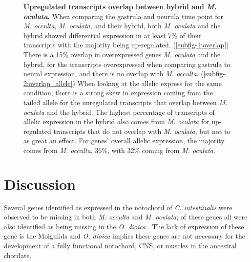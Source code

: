 \begin{figure}[!ht]
	\caption{\textbf{Upregulated transcripts overlap between hybrid and \textit{M. oculata}.} When comparing the gastrula and neurula time point for \textit{M. occulta}, \textit{M. oculata}, and their hybrid, both \textit{M. oculata} and the hybrid showed differential expression in at least 7\% of their transcripts with the majority being up-regulated. (\ref{subfig-1:overlap}) There is a 15\% overlap in overexpressed genes \textit{M. oculata} and the hybrid, for the transcripts overexpressed when comparing gastrula to neural expression, and there is no overlap with \textit{M. occulta}. (\ref{subfig-2:overlap_allele}) When looking at the allelic express for the same condition, there is a strong skew in expression coming from the tailed allele for the unregulated transcripts that overlap between \textit{M. oculata} and the hybrid. The highest percentage of transcripts of allelic expression in the hybrid also comes from \textit{M. oculata} for up-regulated transcripts that do not overlap with \textit{M. oculata}, but not to as great an effect.  For genes' overall allelic expression, the majority comes from \textit{M. occulta}, 36\%, with 32\% coming from \textit{M. oculata}.}	
	\label{fig:upreg_tb}
\end{figure}

\section{Discussion}
Several genes identified as expressed in the notochord of \textit{C. intestinalis} \cite{hotta_characterization_2000,hotta_brachyury-downstream_2007} were observed to be missing in both \textit{M. occulta} and \textit{M. oculata}; of these genes all were also identified as being missing in the \textit{O. dioica} \cite{kugler_evolutionary_2011}. The lack of expression of these gene is the Molgulids and \textit{O. dioica} implies these genes are not necessary for the development of a fully functional notochord, CNS, or muscles in the ancestral chordate.

